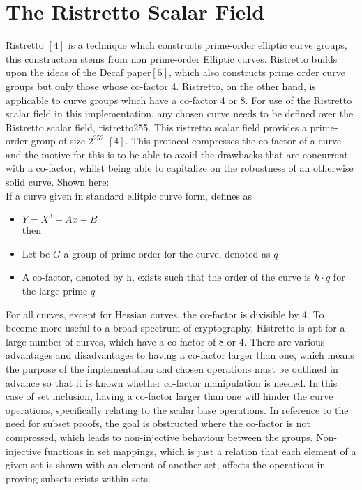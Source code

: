 \documentclass{article}
\begin{document}
\section{The Ristretto Scalar Field}
Ristretto $[4]$ is a technique which constructs prime-order elliptic curve groups, this construction stems from non prime-order Elliptic curves. Ristretto builds upon the ideas of the Decaf paper$[5]$, which also constructs prime order curve groups but only those whose co-factor 4. Ristretto, on the other hand, is applicable to curve groups which have a co-factor 4 or 8. For use of the Ristretto scalar field in this implementation, any chosen curve needs to be defined over the Ristretto scalar field, ristretto255. This ristretto scalar field provides a prime-order group of size $2^{252}$ $[4]$.  This protocol compresses the co-factor of a curve and the motive for this is to be able to avoid the drawbacks that are concurrent with a co-factor, whilst being able to capitalize on the robustness of an otherwise solid curve. Shown here:\\ If a curve given in standard ellitpic curve form, defines as \\
\begin{itemize} 
    \item $Y = X^3 + Ax + B$\\ 
    then
    \item Let be $G$ a group of prime order for the curve, denoted as $q$
    \item  A co-factor, denoted by h, exists such that the order of the curve is $h \cdot q$ for the large prime $q$ 
\end{itemize} 
\hfill \break
For all curves, except for Hessian curves, the co-factor is divisible by 4. To become more useful to a broad spectrum of cryptography, Ristretto is apt for a large number of curves, which have a co-factor of 8 or 4. There are various advantages and disadvantages to having a co-factor larger than one, which means the purpose of the implementation and chosen operations must be outlined in advance so that it is known whether co-factor manipulation is needed. In this case of set inclusion, having a co-factor larger than one will hinder the curve operations, specifically relating to the scalar base operations. In reference to the need for subset proofs, the goal is obstructed where the co-factor is not compressed, which leads to non-injective behaviour between the groups. Non-injective functions in set mappings, which is just a relation that each element of a given set is shown with an element of another set, affects the operations in proving subsets exists within sets. \\
\end{document}
